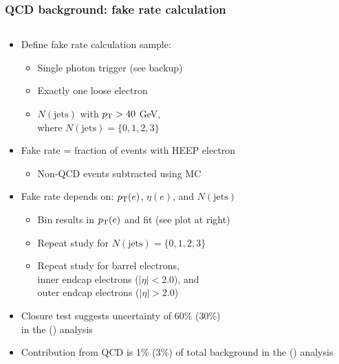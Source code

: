 \documentclass[bigger]{beamer}
\begin{document}
\begin{frame}
\frametitle{QCD background: fake rate calculation}
\label{sec-2-2-3}
\begin{columns}
\begin{column}{0.7\textwidth}
\label{sec-2-2-3-1}

\ChangeItemFont{\scriptsize}{\scriptsize}{\scriptsize}
\begin{itemize}
\item Define fake rate calculation sample:
\begin{itemize}
\item Single photon trigger (see backup)
\item Exactly one loose electron
\item $N(\text{jets})$ with $p_{\text{T}} > 40$ GeV,\\where $N(\text{jets}) = \{0, 1, 2, 3\}$
\end{itemize}
\item Fake rate = fraction of events with HEEP electron
\begin{itemize}
\item Non-QCD events subtracted using MC
\end{itemize}
\item Fake rate depends on: $p_{\text{T}}(e)$, $\eta(e)$, and $N(\text{jets})$
\begin{itemize}
\item Bin results in $p_{\text{T}}(e)$ and fit (see plot at right)
\item Repeat study for $N(\text{jets}) = \{0, 1, 2, 3\}$
\item Repeat study for barrel electrons,\\inner endcap electrons ($|\eta| < 2.0$), and \\
outer endcap electrons ($|\eta| > 2.0$)
\end{itemize}
\item Closure test suggests uncertainty of 60\% (30\%) \\
in the \eejj (\enujj) analysis
\item Contribution from QCD is 1\% (3\%) of total background in the \eejj (\enujj) analysis
\end{itemize}
\end{column}
\begin{column}{0.45\textwidth}
\label{sec-2-2-3-2}


\end{column}
\end{columns}
\end{frame}
\end{document}
